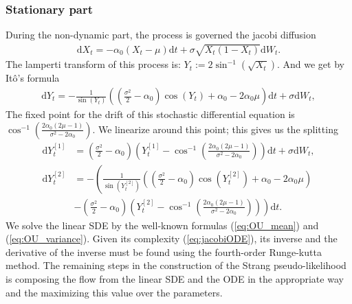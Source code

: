 \subsubsection{Stationary part}
During the non-dynamic part, the process is governed the jacobi diffusion
\begin{align}
    \mathrm{d}X_t = -\alpha_0\left(X_t - \mu\right)\mathrm{d}t + \sigma \sqrt{X_t\left(1 - X_t\right)}\mathrm{d}W_t.
\end{align}
The lamperti transform of this process is: $Y_t := 2 \sin^{-1}\left(\sqrt{X_t}\right)$. And we get by Itô's formula 
\begin{align}
    \mathrm{d}Y_t = -\frac{1}{\sin\left(Y_t\right)}\left(\left(\frac{\sigma^2}{2}-\alpha_0\right)\cos(Y_t) + \alpha_0 - 2\alpha_0\mu\right)\mathrm{d}t + \sigma \mathrm{d}W_t, \label{eq:JacobiLampertiSDE}
\end{align}
The fixed point for the drift of this stochastic differential equation is $\cos^{-1}\left(\frac{2\alpha_0\left(2\mu - 1\right)}{\sigma^2 - 2\alpha_0}\right)$. We linearize around this point; this gives us the splitting
\begin{align}
    \mathrm{d}Y_t^{[1]} &= \left(\frac{\sigma^2}{2} - \alpha_0\right)\left(Y_t^{[1]} - \cos^{-1}\left(\frac{2\alpha_0\left(2\mu - 1\right)}{\sigma^2 - 2\alpha_0}\right)\right)\mathrm{d}t + \sigma \mathrm{d}W_t,\\
    \mathrm{d}Y_t^{[2]} &= -\left(\frac{1}{\sin\left(Y_t^{[2]}\right)}\left(\left(\frac{\sigma^2}{2}-\alpha_0\right)\cos(Y_t^{[2]}) + \alpha_0 - 2\alpha_0\mu\right) \right. \nonumber \\
    &- \left. \left(\frac{\sigma^2}{2} - \alpha_0\right)\left(Y_t^{[2]} - \cos^{-1}\left(\frac{2\alpha_0\left(2\mu - 1\right)}{\sigma^2 - 2\alpha_0}\right)\right) \right)\mathrm{d}t. \label{eq:jacobiODE}
\end{align}
We solve the linear SDE by the well-known formulas (\ref{eq:OU_mean}) and (\ref{eq:OU_variance}). Given its complexity (\ref{eq:jacobiODE}), its inverse and the derivative of the inverse must be found using the fourth-order Runge-kutta method. The remaining steps in the construction of the Strang pseudo-likelihood is composing the flow from the linear SDE and the ODE in the appropriate way and the maximizing this value over the parameters.
